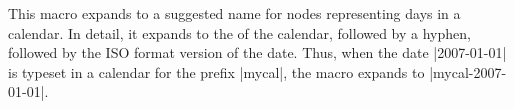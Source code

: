 \begin{command}{\pgfcalendarsuggestedname}
  This macro expands to a suggested name for nodes representing days
  in a calendar. In detail, it expands to the  of the
  calendar, followed by a hyphen, followed by the ISO format version
  of the date. Thus, when the date |2007-01-01| is typeset in a
  calendar for the prefix |mycal|, the macro expands to
  |mycal-2007-01-01|. 
\end{command}


